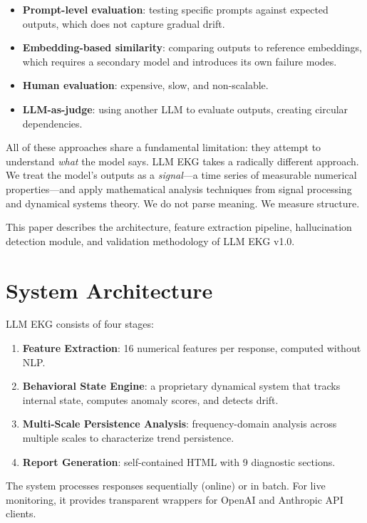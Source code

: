 \documentclass[11pt,a4paper]{article}
\begin{document}
\begin{itemize}[nosep]
    \item \textbf{Prompt-level evaluation}: testing specific prompts against expected outputs, which does not capture gradual drift.
    \item \textbf{Embedding-based similarity}: comparing outputs to reference embeddings, which requires a secondary model and introduces its own failure modes.
    \item \textbf{Human evaluation}: expensive, slow, and non-scalable.
    \item \textbf{LLM-as-judge}: using another LLM to evaluate outputs, creating circular dependencies.
\end{itemize}

All of these approaches share a fundamental limitation: they attempt to understand \emph{what} the model says. LLM EKG takes a radically different approach. We treat the model's outputs as a \emph{signal}---a time series of measurable numerical properties---and apply mathematical analysis techniques from signal processing and dynamical systems theory. We do not parse meaning. We measure structure.

This paper describes the architecture, feature extraction pipeline, hallucination detection module, and validation methodology of LLM EKG v1.0.

\section{System Architecture}

LLM EKG consists of four stages:

\begin{enumerate}[nosep]
    \item \textbf{Feature Extraction}: 16 numerical features per response, computed without NLP.
    \item \textbf{Behavioral State Engine}: a proprietary dynamical system that tracks internal state, computes anomaly scores, and detects drift.
    \item \textbf{Multi-Scale Persistence Analysis}: frequency-domain analysis across multiple scales to characterize trend persistence.
    \item \textbf{Report Generation}: self-contained HTML with 9 diagnostic sections.
\end{enumerate}

The system processes responses sequentially (online) or in batch. For live monitoring, it provides transparent wrappers for OpenAI and Anthropic API clients.
\end{document}
